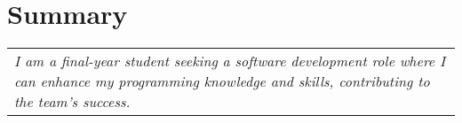 \documentclass[letterpaper,11pt]{article}
\makeatletter
\newcommand{\resumeItem}[1]{
  \item\small{
    {#1 \vspace{-2pt}}
  }
}
\newcommand{\resumeSubheading}[4]{
  \vspace{-2pt}\item
    \begin{tabular*}{1.0\textwidth}[t]{l@{\extracolsep{\fill}}r}
      \textbf{#1} & \textbf{\small #2} \\
      \textit{\small#3} & \textit{\small #4} \\
    \end{tabular*}\vspace{-7pt}
}
\newcommand{\resumeSubHeadingListStart}{\begin{itemize}[leftmargin=0.0in, label={}]}
\newcommand{\resumeSubHeadingListEnd}{\end{itemize}}
\newcommand{\resumeItemListStart}{\begin{itemize}}
\newcommand{\resumeItemListEnd}{\end{itemize}\vspace{-5pt}}
\makeatother
\begin{document}
        

\section{Summary}
\begin{tabular}{p{\linewidth}}
  \textit{\small I am a final-year student seeking a software development role where I can enhance my programming knowledge and skills, contributing to the team's success.}\\
\end{tabular}
\end{document}

